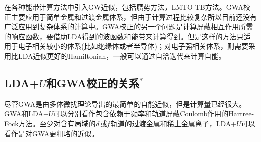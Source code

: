 在各种能带计算方法中引入GW近似，包括赝势方法\cite{PRB34-5390_1986}，LMTO-TB方法\cite{PRL74-3221_1995}。GWA校正主要应用于简单金属和过渡金属体系，但由于计算过程比较复杂所以目前还没有广泛应用到复杂体系的计算中。GWA校正的另一个问题是计算屏蔽相互作用所需的响应函数，要借助LDA得到的波函数和能带来计算得到\cite{JPCM9-767_1997}。但是这样的方法只适用于电子相关较小的体系(比如绝缘体或者半导体)；对电子强相关体系，则需要采用比LDA近似更好的Hamiltonian，一般可以通过自洽迭代来计算自能\cite{PRL74-3221_1995}。

\subsection{LDA+$U$和GWA校正的关系$^\ast$}
尽管GWA是由多体微扰理论导出的最简单的自能近似，但是计算量已经很大。GWA和LDA+$U$可以分别看作包含依赖于频率和轨道屏蔽Coulomb作用的Hartree-Fock方法。至少对含有局域的{\textit d}\,或{\textit f}\,轨道的过渡金属和稀土金属离子，LDA+$U$可以看作是对GWA更粗略的近似\cite{JPCM9-767_1997}。

